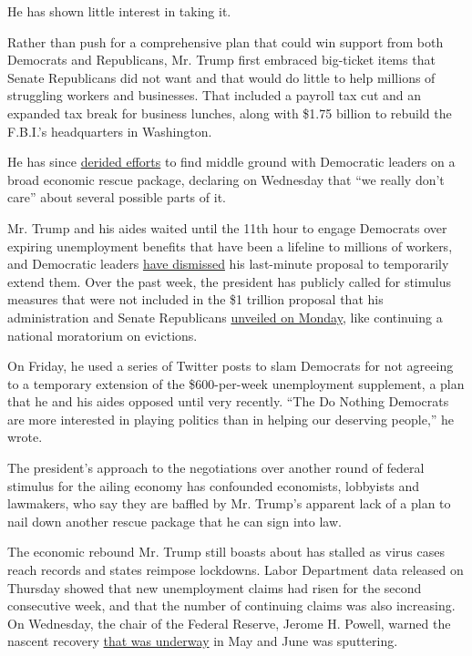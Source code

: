 He has shown little interest in taking it.

Rather than push for a comprehensive plan that could win support from
both Democrats and Republicans, Mr. Trump first embraced big-ticket
items that Senate Republicans did not want and that would do little to
help millions of struggling workers and businesses. That included a
payroll tax cut and an expanded tax break for business lunches, along
with \$1.75 billion to rebuild the F.B.I.'s headquarters in Washington.

He has since
\href{https://www.nytimes3xbfgragh.onion/2020/07/29/business/economy/virus-aid-trump.html?referringSource=articleShare}{derided
efforts} to find middle ground with Democratic leaders on a broad
economic rescue package, declaring on Wednesday that ``we really don't
care'' about several possible parts of it.

Mr. Trump and his aides waited until the 11th hour to engage Democrats
over expiring unemployment benefits that have been a lifeline to
millions of workers, and Democratic leaders
\href{https://www.nytimes3xbfgragh.onion/2020/07/30/us/politics/senate-virus-aid.html}{have
dismissed} his last-minute proposal to temporarily extend them. Over the
past week, the president has publicly called for stimulus measures that
were not included in the \$1 trillion proposal that his administration
and Senate Republicans
\href{https://www.nytimes3xbfgragh.onion/2020/07/27/us/politics/republicans-jobless-aid.html}{unveiled
on Monday}, like continuing a national moratorium on evictions.

On Friday, he used a series of Twitter posts to slam Democrats for not
agreeing to a temporary extension of the \$600-per-week unemployment
supplement, a plan that he and his aides opposed until very recently.
``The Do Nothing Democrats are more interested in playing politics than
in helping our deserving people,'' he wrote.

The president's approach to the negotiations over another round of
federal stimulus for the ailing economy has confounded economists,
lobbyists and lawmakers, who say they are baffled by Mr. Trump's
apparent lack of a plan to nail down another rescue package that he can
sign into law.

The economic rebound Mr. Trump still boasts about has stalled as virus
cases reach records and states reimpose lockdowns. Labor Department data
released on Thursday showed that new unemployment claims had risen for
the second consecutive week, and that the number of continuing claims
was also increasing. On Wednesday, the chair of the Federal Reserve,
Jerome H. Powell, warned the nascent recovery
\href{https://www.nytimes3xbfgragh.onion/2020/07/29/business/economy/federal-reserve-meeting-interest-rates.html}{that
was underway} in May and June was sputtering.


